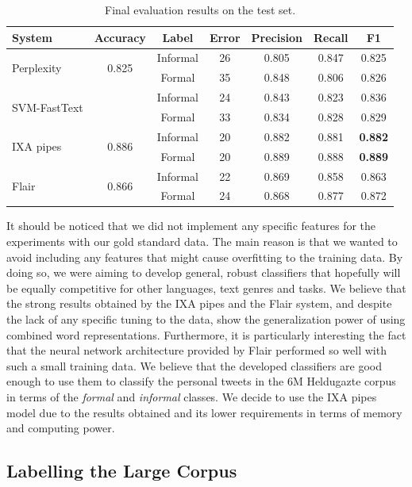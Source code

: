 \documentclass[information,article,submit,moreauthors,pdftex,10pt,a4paper]{Definitions/mdpi}
\begin{document}
\begin{table}[H]
  \centering
  \begin{tabular}{lcccccc} \hline
    System & Accuracy & Label & Error & Precision & Recall & F1 \\ \hline \hline
    \multirow{2}{*}{Perplexity} & \multirow{2}{*}{0.825} & Informal & 26 & 0.805 & 0.847 & 0.825 \\
    & & Formal & 35 & 0.848 & 0.806 & 0.826 \\ \hline \hline
    \multirow{2}{*}{SVM-FastText} & \multirow{2}{*}{} & Informal & 24 & 0.843  & 0.823 & 0.836 \\
    & & Formal & 33 & 0.834  & 0.828 & 0.829 \\ \hline \hline
    \multirow{2}{*}{IXA pipes} & \multirow{2}{*}{0.886} & Informal & 20 & 0.882 & 0.881 & \textbf{0.882} \\
    & & Formal & 20 & 0.889 & 0.888 & \textbf{0.889} \\ \hline \hline
    \multirow{2}{*}{Flair} & \multirow{2}{*}{0.866} & Informal & 22 & 0.869 & 0.858 & 0.863 \\
    & & Formal & 24 & 0.868 & 0.877 & 0.872 \\ \hline
 \end{tabular}
  \caption{Final evaluation results on the test set.}
  \label{tab:testresults}
\end{table}

It should be noticed that we did not implement any specific features for the experiments with our gold standard data. The main reason is that we wanted to avoid including any features that might cause overfitting to the training data. By doing so, we were aiming to develop general, robust classifiers that hopefully will be equally competitive for other languages, text genres and tasks. We believe that the strong results obtained by the IXA pipes and the Flair system, and despite the lack of any specific tuning to the data, show the generalization power of using combined word representations. Furthermore, it is particularly interesting the fact that the neural network architecture provided by Flair performed so well with such a small training data. We believe that the developed classifiers are good enough to use them to classify the personal tweets in the 6M Heldugazte corpus in terms of the \emph{formal} and \emph{informal} classes. We decide to use the IXA pipes model due to the results obtained and its lower requirements in terms of memory and computing power.

\subsection{Labelling the Large Corpus}\label{sec:apl}
\end{document}
